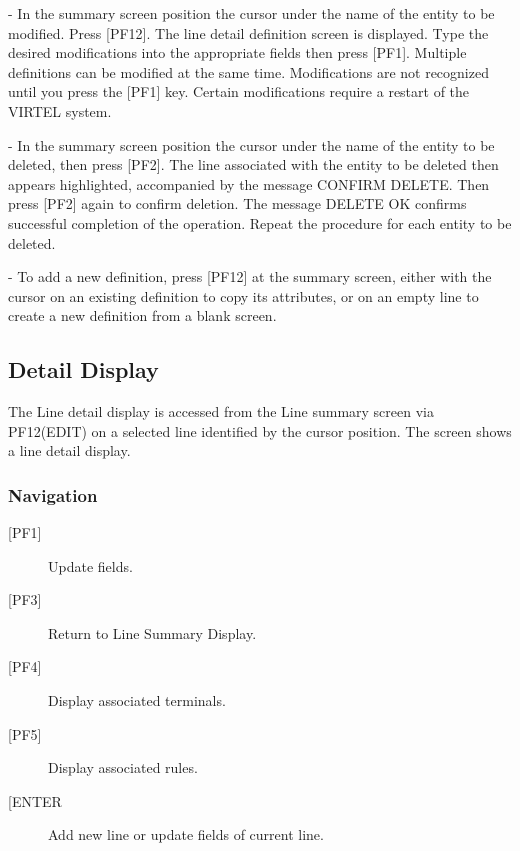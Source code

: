 \documentclass[letterpaper,10pt,english]{sphinxmanual}
\begin{document}
 - In the summary screen position the cursor under the name of the entity to be modified. Press {[}PF12{]}. The line detail definition screen is displayed. Type the desired modifications into the appropriate fields then press {[}PF1{]}. Multiple definitions can be modified at the same time. Modifications are not recognized until you press the {[}PF1{]} key. Certain modifications require a restart of the VIRTEL system.

 - In the summary screen position the cursor under the name of the entity to be deleted, then press {[}PF2{]}. The line associated with the entity to be deleted then appears highlighted, accompanied by the message CONFIRM DELETE. Then press {[}PF2{]} again to confirm deletion. The message DELETE OK confirms successful completion of the operation. Repeat the procedure for each entity to be deleted.

 - To add a new definition, press {[}PF12{]} at the summary screen, either with the cursor on an existing definition to copy its attributes, or on an empty line to create a new definition from a blank screen.

\newpage

\ignorespaces 

\subsection{Detail Display}
\label{\detokenize{connectivity_guide:detail-display}}\label{\detokenize{connectivity_guide:index-7}}
The Line detail display is accessed from the Line summary screen via PF12(EDIT) on a selected line identified by the cursor position. The screen shows a line detail display.



\subsubsection{Navigation}
\label{\detokenize{connectivity_guide:id1}}\begin{description}
\item[{{[}PF1{]}}] \leavevmode
Update fields.

\item[{{[}PF3{]}}] \leavevmode
Return to Line Summary Display.

\item[{{[}PF4{]}}] \leavevmode
Display associated terminals.

\item[{{[}PF5{]}}] \leavevmode
Display associated rules.

\item[{{[}ENTER}] \leavevmode
Add new line or update fields of current line.

\end{description}
\end{document}
